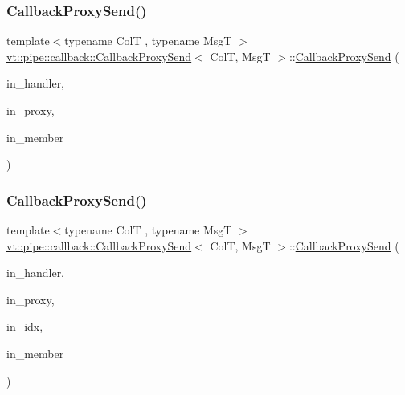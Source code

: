 \subsubsection{\texorpdfstring{Callback\+Proxy\+Send()}{CallbackProxySend()}\hspace{0.1cm}{\footnotesize\ttfamily [1/2]}}
{\footnotesize\ttfamily template$<$typename ColT , typename MsgT $>$ \\
\hyperlink{structvt_1_1pipe_1_1callback_1_1_callback_proxy_send}{vt\+::pipe\+::callback\+::\+Callback\+Proxy\+Send}$<$ ColT, MsgT $>$\+::\hyperlink{structvt_1_1pipe_1_1callback_1_1_callback_proxy_send}{Callback\+Proxy\+Send} (\begin{DoxyParamCaption}\item[{\hyperlink{namespacevt_af64846b57dfcaf104da3ef6967917573}{Handler\+Type} const \&}]{in\+\_\+handler,  }\item[{\hyperlink{structvt_1_1pipe_1_1callback_1_1_callback_proxy_send_a993aff1afaaf07a0d2c60a4ca96426f8}{Indexed\+Proxy\+Type} const \&}]{in\+\_\+proxy,  }\item[{bool const \&}]{in\+\_\+member }\end{DoxyParamCaption})\hspace{0.3cm}{\ttfamily [inline]}}

\mbox{\label{structvt_1_1pipe_1_1callback_1_1_callback_proxy_send_a053e9ba748e53084c8f58c2d1a11773b}} 
\subsubsection{\texorpdfstring{Callback\+Proxy\+Send()}{CallbackProxySend()}\hspace{0.1cm}{\footnotesize\ttfamily [2/2]}}
{\footnotesize\ttfamily template$<$typename ColT , typename MsgT $>$ \\
\hyperlink{structvt_1_1pipe_1_1callback_1_1_callback_proxy_send}{vt\+::pipe\+::callback\+::\+Callback\+Proxy\+Send}$<$ ColT, MsgT $>$\+::\hyperlink{structvt_1_1pipe_1_1callback_1_1_callback_proxy_send}{Callback\+Proxy\+Send} (\begin{DoxyParamCaption}\item[{\hyperlink{namespacevt_af64846b57dfcaf104da3ef6967917573}{Handler\+Type} const \&}]{in\+\_\+handler,  }\item[{\hyperlink{structvt_1_1pipe_1_1callback_1_1_callback_proxy_send_a2aece7c6f8bd17a4c0b1fdca75d84579}{Proxy\+Type} const \&}]{in\+\_\+proxy,  }\item[{\hyperlink{structvt_1_1pipe_1_1callback_1_1_callback_proxy_send_adf233dca6b029304153ba59fecf6113f}{Index\+Type} const \&}]{in\+\_\+idx,  }\item[{bool const \&}]{in\+\_\+member }\end{DoxyParamCaption})\hspace{0.3cm}{\ttfamily [inline]}}



